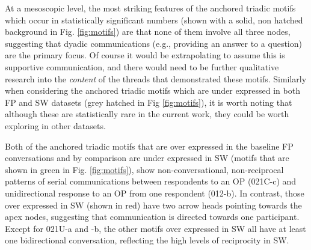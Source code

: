 
At a mesoscopic level, the most striking features of the anchored triadic motifs which occur in statistically significant numbers (shown with a solid, non hatched background in Fig. \ref{fig:motifs}) are that none of them involve all three nodes, suggesting that dyadic communications (e.g., providing an answer to a question) are the primary focus.  Of course it would be extrapolating to assume this is supportive communication, and there would need to be further qualitative research into the \textit{content} of the threads that demonstrated these motifs.  Similarly when considering the anchored triadic motifs which are under expressed in both FP and SW datasets (grey hatched in Fig \ref{fig:motifs}), it is worth noting that although these are statistically rare in the current work, they could be worth exploring in other datasets.

Both of the anchored triadic motifs that are over expressed in the baseline FP conversations and by comparison are under expressed in SW (motifs that are shown in green in Fig. \ref{fig:motifs}), show non-conversational, non-reciprocal patterns of serial communications between respondents to an OP (021C-c) and unidirectional response to an OP from one respondent (012-b). In contrast, those over expressed in SW (shown in red) have two arrow heads pointing towards the apex nodes, suggesting that communication is directed towards one participant. Except for 021U-a and -b, the other motifs over expressed in SW all have at least one bidirectional conversation, reflecting the high levels of reciprocity in SW. 


